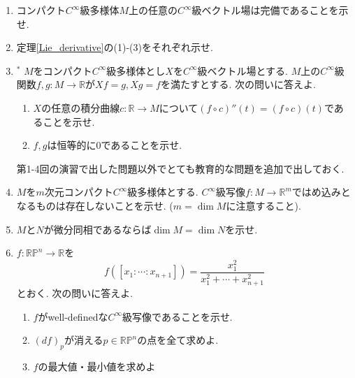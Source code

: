 \documentclass[dvipdfmx,a4paper,11pt]{article}
\newcommand{\R}{\mathbb{R}}
\theoremstyle{definition}
\begin{document}
\begin{enumerate}[label=\textbf{問}2.\arabic*]
\item コンパクト$C^{\infty}$級多様体$M$上の任意の$C^{\infty}$級ベクトル場は完備であることを示せ.

\item  定理\ref{Lie_derivative}の(1)-(3)をそれぞれ示せ. 

\item $^{*}$ $M$をコンパクト$C^{\infty}$級多様体とし$X$を$C^{\infty}$級ベクトル場とする. 
$M$上の$C^{\infty}$級関数$f,g : M \rightarrow \R$が$Xf = g, Xg =f$を満たすとする.
次の問いに答えよ.
\begin{enumerate}
\item $X$の任意の積分曲線$c : \R \rightarrow M$について$(f \circ c)'' (t) = (f \circ c) (t)$であることを示せ.
\item $f,g$は恒等的に0であることを示せ. 
\end{enumerate}


\vspace{11pt}
\hspace{-33pt}{\large $\bullet$教育的な問題}


第1-4回の演習で出した問題以外でとても教育的な問題を追加で出しておく. 



\item $M$を$m$次元コンパクト$C^{\infty}$級多様体とする. $C^{\infty}$級写像$f: M \rightarrow \R^{m}$ではめ込みとなるものは存在しないことを示せ. ($m = \dim M$に注意すること).
\item $M$と$N$が微分同相であるならば$\dim M =\dim N$を示せ. 
\item $f : \R \mathbb{P}^{n} \rightarrow \R$を
$$
f([x_1: \cdots : x_{n+1}] ) = \frac{x_{1}^{2}}{x_{1}^{2} + \cdots+ x_{n+1}^{2}}
$$
とおく. 次の問いに答えよ.
\begin{enumerate}
\item $f$がwell-definedな$C^{\infty}$級写像であることを示せ.
\item $(df)_{p}$が消える$p \in \R \mathbb{P}^{n}$の点を全て求めよ. 
\item $f$の最大値・最小値を求めよ
\end{enumerate}


\end{enumerate}
\end{document}
